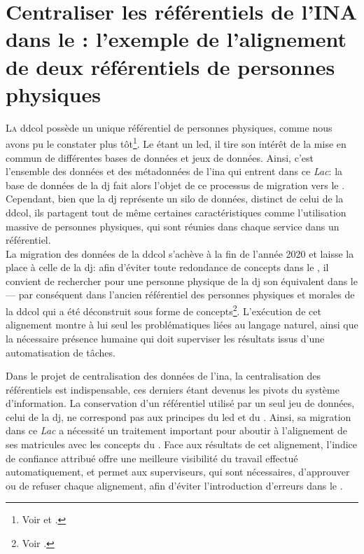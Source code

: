 \chapter{\label{III-C}Centraliser les référentiels de l’INA dans le \ldd: l'exemple de l'alignement de deux référentiels de personnes physiques}

\lettrine{L}a \ac{ddcol} possède un unique référentiel de personnes physiques, comme nous avons pu le constater plus tôt\footnote{Voir  et .}. Le \ldd étant un \ac{led}, il tire son intérêt de la mise en commun de différentes bases de données et jeux de données. Ainsi, c'est l'ensemble des données et des métadonnées de l'\ac{ina} qui entrent dans ce \textit{Lac}: la base de données de la \ac{dj} fait alors l'objet de ce processus de migration vers le \ldd. Cependant, bien que la \ac{dj} représente un silo de données, distinct de celui de la \ac{ddcol}, ils partagent tout de même certaines caractéristiques comme l'utilisation massive de personnes physiques, qui sont réunies dans chaque service dans un référentiel.\\

La migration des données de la \ac{ddcol} s'achève à la fin de l'année 2020 et laisse la place à celle de la \ac{dj}: afin d'éviter toute redondance de concepts dans le \ldd, il convient de rechercher pour une personne physique de la \ac{dj} son équivalent dans le \ldd --- par conséquent dans l'ancien référentiel des personnes physiques et morales de la \ac{ddcol} qui a été déconstruit sous forme de concepts\footnote{Voir .}. L'exécution de cet alignement montre à lui seul les problématiques liées au langage naturel, ainsi que la nécessaire présence humaine qui doit superviser les résultats issus d'une automatisation de tâches.





\bigskip
\bigskip
Dans le projet de centralisation des données de l'\ac{ina}, la centralisation des référentiels est indispensable, ces derniers étant devenus les pivots du système d'information. La conservation d'un référentiel utilisé par un seul jeu de données, celui de la \ac{dj}, ne correspond pas aux principes du \ac{led} et du \ldd. Ainsi, sa migration dans ce \textit{Lac} a nécessité un traitement important pour aboutir à l'alignement de ses matricules avec les concepts du \ldd. Face aux résultats de cet alignement, l'indice de confiance attribué offre une meilleure visibilité du travail effectué automatiquement, et permet aux superviseurs, qui sont nécessaires, d'approuver ou de refuser chaque alignement, afin d'éviter l'introduction d'erreurs dans le \ldd.